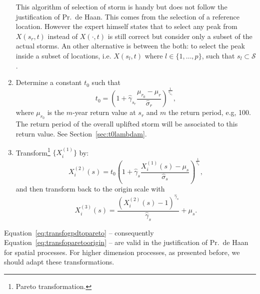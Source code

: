 \begin{enumerate}
This algorithm of selection of storm is handy but does not follow the justification of Pr.~de Haan. This comes from the selection of a reference location. However the expert himself states that to select any peak from $X(s_r,t)$ instead of $X(\cdotp,t)$ is still correct but consider only a subset of the actual storms. An other alternative is between the both: {\color{red} to select the peak inside a subset of locations, i.e. $X(s_l,t)$ where $l \in \{1,\ldots,p\} $, such that $s_l \subset \mathcal{S}$.}
\item  Determine a constant $t_0$ such that
	\begin{equation}
	\label{eq:t0}
	t_0 = \left( 1+ \hat{\gamma}_{s_r}  \frac{\mu_{r_0} - \mu_{r}}{\hat{\sigma}_{r}} \right)^{\frac{1}{\hat{\gamma}_{s_r}}},
	\end{equation}
where $\mu_{r_0}$ is the $m$-year return value at $s_r$ and $m$ the return period, e.g, 100. The return period of the overall uplifted storm will be associated to this return value. See Section~\ref{sec:t0lambdam}.
\item Transform{\footnote{Pareto transformation.}} $\{X^{(1)}_i\}$ by:
	\begin{equation}
	\label{eq:transfogpdtopareto}
	X^{(2)}_i(s) = t_0 \left( 1 + \hat{\gamma}_{s} \frac{X^{(1)}_i(s) - \mu_{s}}{\hat{\sigma}_s} \right)^{\frac{1}{\hat{\gamma}_s}},
	\end{equation}
and then transform back to the origin scale with
	\begin{equation}
	\label{eq:transfoparetoorigin}
	X^{(3)}_i(s) = \frac{\left(X^{(2)}_i(s) -1 \right)^{\hat{\gamma}_s}}{\hat{\gamma}_s} + \mu_{s} .
	\end{equation}
\end{enumerate}

Equation~\ref{eq:transfogpdtopareto} -- consequently Equation~\ref{eq:transfoparetoorigin} -- are  valid in the justification of Pr.~de Haan for spatial processes. For higher dimension processes, as presented before, we should adapt these transformations. 

